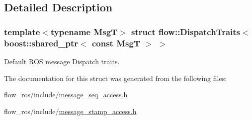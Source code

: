 \subsection{Detailed Description}
\subsubsection*{template$<$typename MsgT$>$\newline
struct flow\+::\+Dispatch\+Traits$<$ boost\+::shared\+\_\+ptr$<$ const Msg\+T $>$ $>$}

Default R\+OS message Dispatch traits. 

The documentation for this struct was generated from the following files\+:\begin{DoxyCompactItemize}
\item 
flow\+\_\+ros/include/\hyperlink{message__seq__access_8h}{message\+\_\+seq\+\_\+access.\+h}\item 
flow\+\_\+ros/include/\hyperlink{message__stamp__access_8h}{message\+\_\+stamp\+\_\+access.\+h}\end{DoxyCompactItemize}

